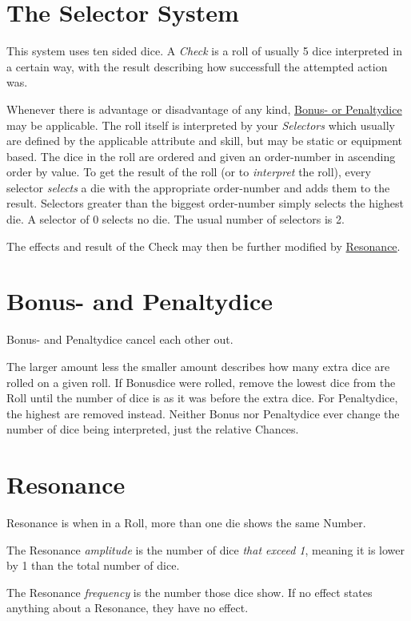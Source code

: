 \section{The Selector System}\label{sec:selectorsystem}
This system uses ten sided dice.
A \emph{Check} is a roll of usually 5 dice interpreted in a certain way,
with the result describing how successfull the attempted action was.\par
Whenever there is advantage or disadvantage of any kind,
\hyperref[sec:bonus--and-penaltydice]{Bonus- or Penaltydice} may be applicable.
The roll itself is interpreted by your \emph{Selectors} which usually are defined
by the applicable attribute and skill, but may be static or equipment based.
The dice in the roll are ordered and given an order-number in ascending order by value.
To get the result of the roll (or to \emph{interpret} the roll), every selector \emph{selects} a die with the
appropriate order-number and adds them to the result.
Selectors greater than the biggest order-number simply selects the highest die.
A selector of 0 selects no die.
The usual number of selectors is 2.\par
The effects and result of the Check may then be further modified by \hyperref[sec:resonance]{Resonance}.

\section{Bonus- and Penaltydice}\label{sec:bonus--and-penaltydice}
Bonus- and Penaltydice cancel each other out.\par
The larger amount less the smaller amount describes how many extra dice are rolled on a given roll.
If Bonusdice were rolled,
remove the lowest dice from the Roll until the number of dice is as it was before the extra dice.
For Penaltydice, the highest are removed instead.
Neither Bonus nor Penaltydice ever change the number of dice being interpreted, just the relative Chances.

\section{Resonance}\label{sec:resonance}
Resonance is when in a Roll, more than one die shows the same Number.\par
The Resonance \emph{amplitude} is the number of dice \emph{that exceed 1}, meaning it is lower by 1 than the total
number of dice.\par
The Resonance \emph{frequency} is the number those dice show.
If no effect states anything about a Resonance, they have no effect.

